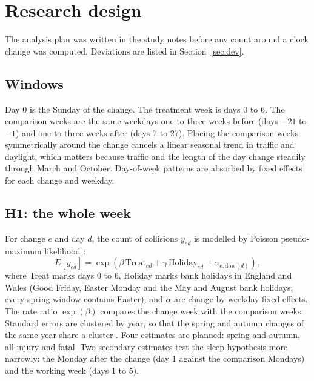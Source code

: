 \documentclass[11pt,a4paper]{article}
\begin{document}
\section{Research design}\label{sec:design}
The analysis plan was written in the study notes before any count around a clock change was computed. Deviations are listed in Section~\ref{sec:dev}.

\subsection{Windows}
Day 0 is the Sunday of the change. The treatment week is days 0 to 6. The comparison weeks are the same weekdays one to three weeks before (days $-21$ to $-1$) and one to three weeks after (days 7 to 27). Placing the comparison weeks symmetrically around the change cancels a linear seasonal trend in traffic and daylight, which matters because traffic and the length of the day change steadily through March and October. Day-of-week patterns are absorbed by fixed effects for each change and weekday.

\subsection{H1: the whole week}
For change $e$ and day $d$, the count of collisions $y_{ed}$ is modelled by Poisson pseudo-maximum likelihood \citep{santos2006,correia2020}:
\begin{equation}
E[y_{ed}] = \exp(\beta\,\text{Treat}_{ed} + \gamma\,\text{Holiday}_{ed} + \alpha_{e,\text{dow}(d)}),
\end{equation}
where Treat marks days 0 to 6, Holiday marks bank holidays in England and Wales (Good Friday, Easter Monday and the May and August bank holidays; every spring window contains Easter), and $\alpha$ are change-by-weekday fixed effects. The rate ratio $\exp(\beta)$ compares the change week with the comparison weeks. Standard errors are clustered by year, so that the spring and autumn changes of the same year share a cluster \citep{cameron2015,abadie2023}. Four estimates are planned: spring and autumn, all-injury and fatal. Two secondary estimates test the sleep hypothesis more narrowly: the Monday after the change (day 1 against the comparison Mondays) and the working week (days 1 to 5).
\end{document}

